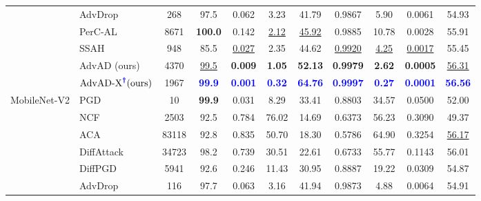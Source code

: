 \documentclass{article}
\begin{document}
\begin{table}[!h]
{\begin{tabular}{cp{2.2cm}ccccccccc}
                                    & AdvDrop       & 268    & 97.5      & {0.062}     & {3.23}      & 41.79     & 0.9867   & 5.90    & 0.0061   & 54.93 \\
                                    & PerC-AL       & 8671   & \textbf{100.0}     & 0.142     & \underline{2.12}      & \underline{45.92}     & 0.9885   & 10.78   & 0.0028   & 55.91 \\
                                    & SSAH  & 948    & 85.5      & \underline{0.027}     & 2.35      & 44.62     & \underline{0.9920}   & \underline{4.25}    & \underline{0.0017}   & 55.45 \\
                                     \cmidrule(lr){2-11}
                                    & AdvAD (ours)       & {4370}   & \underline{99.5}      & \textbf{0.009}     & \textbf{1.05}      & \textbf{52.13}     & \textbf{0.9979}   & \textbf{2.62}    & \textbf{0.0005}   & \underline{56.31} \\
                                    & $\text{AdvAD-X}^{\textcolor{blue}{\boldsymbol{\dag}}} \text{(ours)}$ & {1967}  & \textcolor{blue}{\textbf{99.9}}      & \textcolor{blue}{\textbf{0.001}}     & \textcolor{blue}{\textbf{0.32}}      & \textcolor{blue}{\textbf{64.76}}     & \textcolor{blue}{\textbf{0.9997}}   & \textcolor{blue}{\textbf{0.27}}    & \textcolor{blue}{\textbf{0.0001}}   & \textcolor{blue}{\textbf{56.56}} \\
        \bottomrule
             \multirow{10}{*}{MobileNet-V2}  
                                    & PGD           & {10}     & \textbf{99.9}     & {0.031}     & 8.29      & 33.41     & 0.8803   & 34.57   & 0.0500   & {52.00} \\
                                    & NCF           & 2503  & 92.5     & 0.784     & 76.02     & 14.69     & 0.6373   & 56.23   & 0.3090   & 49.37 \\
                                    & ACA     & 83118  & 92.8     & 0.835     & 50.70     & 18.30     & 0.5786   & 64.90   & 0.3254   & \underline{56.17} \\
                                    & DiffAttack    & 34723  & {98.2}     & 0.739     & 30.51     & 22.61     & 0.6733   & 55.77   & 0.1143   & 56.01 \\
                                    & DiffPGD & 5941   & 92.6     & {0.246}     & 11.43     & 30.95     & {0.8887}   & {19.22}   & {0.0309}   & 54.87 \\
                                    & AdvDrop       & 116    & 97.7     & {0.063}     & {3.16}      & {41.94}     & 0.9873   & {4.88}    & 0.0064   & 54.91 \\

\end{tabular}}
\end{table}
\end{document}
